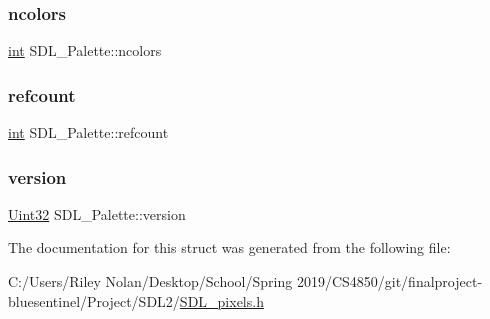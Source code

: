 \subsubsection{\texorpdfstring{ncolors}{ncolors}}
{\footnotesize\ttfamily \mbox{\hyperlink{warnings_8h_a74f207b5aa4ba51c3a2ad59b219a423b}{int}} S\+D\+L\+\_\+\+Palette\+::ncolors}

\mbox{\label{struct_s_d_l___palette_a35c667737f883f973bb0a8dea143b08d}} 
\subsubsection{\texorpdfstring{refcount}{refcount}}
{\footnotesize\ttfamily \mbox{\hyperlink{warnings_8h_a74f207b5aa4ba51c3a2ad59b219a423b}{int}} S\+D\+L\+\_\+\+Palette\+::refcount}

\mbox{\label{struct_s_d_l___palette_a5b8d45519f6850a32f13f1602ce37a8e}} 
\subsubsection{\texorpdfstring{version}{version}}
{\footnotesize\ttfamily \mbox{\hyperlink{_s_d_l__stdinc_8h_add440eff171ea5f55cb00c4a9ab8672d}{Uint32}} S\+D\+L\+\_\+\+Palette\+::version}



The documentation for this struct was generated from the following file\+:\begin{DoxyCompactItemize}
\item 
C\+:/\+Users/\+Riley Nolan/\+Desktop/\+School/\+Spring 2019/\+C\+S4850/git/finalproject-\/bluesentinel/\+Project/\+S\+D\+L2/\mbox{\hyperlink{_s_d_l__pixels_8h}{S\+D\+L\+\_\+pixels.\+h}}\end{DoxyCompactItemize}
